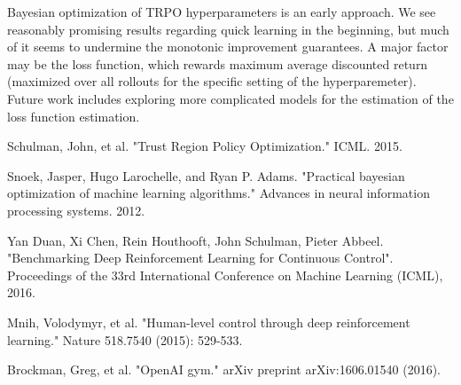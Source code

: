 \documentclass[12pt]{article}
\theoremstyle{plain}
\begin{document}
Bayesian optimization of TRPO hyperparameters is an early approach. We see reasonably promising results regarding quick learning in the beginning, but much of it seems to undermine the monotonic improvement guarantees. A major factor may be the loss function, which rewards maximum average discounted return (maximized over all rollouts for the specific setting of the hyperparemeter). Future work includes exploring more complicated models for the estimation of the loss function estimation.

\newpage

\begin{thebibliography}{99}

 Schulman, John, et al. "Trust Region Policy Optimization." ICML. 2015.

 Snoek, Jasper, Hugo Larochelle, and Ryan P. Adams. "Practical bayesian optimization of machine learning algorithms." Advances in neural information processing systems. 2012.

 Yan Duan, Xi Chen, Rein Houthooft, John Schulman, Pieter Abbeel. "Benchmarking Deep Reinforcement Learning for Continuous Control". Proceedings of the 33rd International Conference on Machine Learning (ICML), 2016.

 Mnih, Volodymyr, et al. "Human-level control through deep reinforcement learning." Nature 518.7540 (2015): 529-533.

 Brockman, Greg, et al. "OpenAI gym." arXiv preprint arXiv:1606.01540 (2016).

\end{thebibliography}
\end{document}
